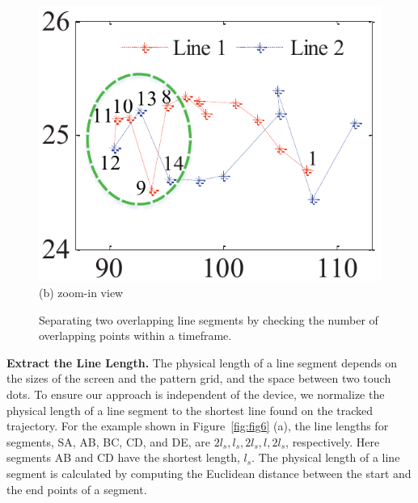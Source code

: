 \begin{figure}[!t]
{\begin{minipage}[b]{0.225\textwidth}
                \includegraphics[width=\textwidth]{fig/line-identification2.pdf}\\
                \centering  (b) zoom-in view
                \end{minipage}
            }
            \caption{Separating two overlapping line segments by checking the number of overlapping points within a timeframe.}
            \label{fig:line-idenfication}
        \end{figure}
        \vspace{2mm}
        \noindent \textbf{Extract the Line Length.}
        The physical length of a line segment depends
        on the sizes of the screen and the pattern grid, and the space between two touch dots.
        To ensure our approach is independent of the device, we normalize the physical length of a line segment to the
        shortest line found on the tracked trajectory. For the
        example shown in Figure~\ref{fig:fig6} (a), the line lengths for segments, SA, AB, BC, CD, and DE, are $2l_{s},l_{s},2l_{s},l,2l_{s}$, respectively.
        Here segments AB and CD have the shortest length, $l_s$. The physical length of a line segment is calculated by computing the
        Euclidean distance between the start and the end points of a segment.

